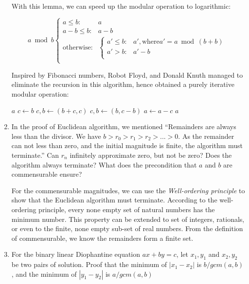 \documentclass[UTF8]{article}
\begin{document}
\begin{enumerate}
With this lemma, we can speed up the modular operation to logarithmic:

\[
a \bmod b \begin{cases}
a \leq b: & a \\
a - b \leq b: & a - b \\
\text{otherwise}: & \begin{cases}
  a' \leq b: & a', \text{where} a' = a \bmod (b + b) \\
  a' > b: & a' - b \\
  \end{cases} \\
\end{cases}
\]

Inspired by Fibonacci numbers, Robot Floyd, and Donald Knuth managed to eliminate the recursion in this algorithm, hence obtained a purely iterative modular operation:

\begin{algorithmic}
    \State \Return $a$
  \EndIf
  \State $c \gets b$
    \State $c, b \gets (b + c, c)$ 
  \EndWhile
    \State $c, b \gets (b, c - b)$ 
      \State $a \gets a - c$
    \EndIf
  \EndWhile
  \State \Return $a$
\EndFunction
\end{algorithmic}

\item {In the proof of Euclidean algorithm, we mentioned ``Remainders are always less than the divisor. We have $b > r_0 > r_1 > r_2 > ... > 0$. As the remainder can not less than zero, and the initial magnitude is finite, the algorithm must terminate.'' Can $r_{n}$ infinitely approximate zero, but not be zero? Does the algorithm always terminate? What does the precondition that $a$ and $b$ are commensurable ensure?}

For the commensurable magnitudes, we can use the {\em Well-ordering principle} to show that the Euclidean algorithm must terminate. According to the well-ordering principle, every none empty set of natural numbers has the minimum number. This property can be extended to set of integers, rationals, or even to the finite, none empty sub-set of real numbers. From the definition of commensurable, we know the remainders form a finite set.

\item {For the binary linear Diophantine equation $ax + by = c$, let $x_1, y_1$ and $x_2, y_2$ be two pairs of solution. Proof that the minimum of $|x_1 - x_2|$ is $b/gcm(a, b)$, and the minimum of $|y_1 - y_2|$ is $a/gcm(a, b)$}


\end{enumerate}
\end{document}
